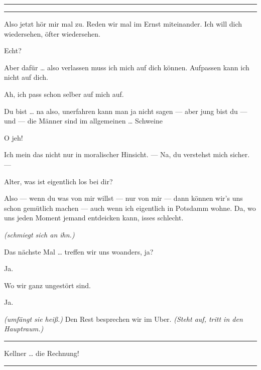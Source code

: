 \documentclass[
	final,
	a4paper,
	ngerman,
	mpinclude = true, %
	twoside = true,
	open = right,
	cleardoublepage = plain,
	DIV = 13,
	BCOR = 1cm,
	titlepage = firstiscover,
	]{scrbook}
\newcommand{\marginnote}[1]{\marginpar{\singlespacing\raggedright\footnotesize#1}}
\newcommand{\direction}[1]{\textit{(#1)}}
\newenvironment{deletion}{%
		\vspace{0.25\baselineskip}
		\hrule
		\vspace{0.25\baselineskip}
		\color{darkgray}
	}{
		\color{black}
		\vspace{0.25\baselineskip}
		\hrule 
		\vspace{0.25\baselineskip}
	}
\newcommand{\thecharacter}[1]{\textup{\textsc{#1}}\xspace}
\newcommand{\thegatte}{\thecharacter{Christian}}
\newcommand{\thesuesse}{\thecharacter{Lola}}
\newcommand{\character}[1]{\item[#1:]}
\newcommand{\gatte}{\character{\thegatte}}
\newcommand{\suesse}{\character{\thesuesse}}
\begin{document}
\begin{play}
\begin{deletion}
	\gatte
	\end{deletion}
	Also jetzt hör mir mal zu. Reden wir mal im Ernst miteinander. Ich will dich wiedersehen, öfter wiedersehen.

	\suesse
	Echt?

	\gatte
	Aber dafür \ldots{} also verlassen muss ich mich auf dich können. Aufpassen kann ich nicht auf dich.

	\suesse
	Ah, ich pass schon selber auf mich auf.

	\gatte
	Du bist \ldots{} na also, unerfahren kann man ja nicht sagen --- aber jung bist du --- und --- die Männer sind im allgemeinen \ldots{} Schweine

	\suesse
	O jeh!

	\gatte
	Ich mein das nicht nur in moralischer Hinsicht. --- Na, du verstehst mich sicher. ---

	\marginnote{\textit{Ich glaub es hackt?}}
	\suesse
	Alter, was ist eigentlich los bei dir?

	\gatte
	Also --- wenn du was von mir willst --- nur von mir --- dann können wir's uns schon gemütlich machen --- auch wenn ich eigentlich in Potsdamm wohne. Da, wo uns jeden Moment jemand entdeicken kann, isses schlecht.

	\suesse
	\direction{schmiegt sich an ihn.}

	\gatte
	Das nächste Mal \ldots{} treffen wir uns woanders, ja?

	\suesse
	Ja.

	\gatte
	Wo wir ganz ungestört sind.

	\suesse
	Ja.

	\gatte
	\direction{umfängt sie heiß.} Den Rest besprechen wir im Uber. \direction{Steht auf, tritt in den Hauptraum.}
	\begin{deletion}
	Kellner \ldots{} die Rechnung!
	\end{deletion}

\end{play}
\end{document}
